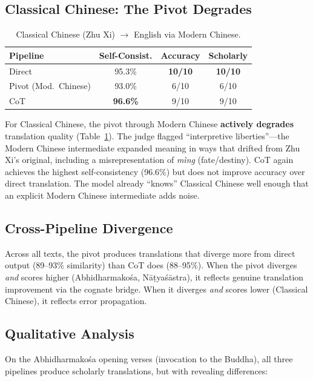 \documentclass[10pt,twocolumn]{article}
\begin{document}
\subsection{Classical Chinese: The Pivot Degrades}

\begin{table}[H]
\small
\centering
\caption{Classical Chinese (Zhu Xi) $\to$ English via Modern Chinese.}
\label{tab:chinese}
\begin{tabular}{@{}lccc@{}}
\toprule
Pipeline & Self-Consist. & Accuracy & Scholarly \\
\midrule
Direct & 95.3\% & \textbf{10/10} & \textbf{10/10} \\
Pivot (Mod.\ Chinese) & 93.0\% & 6/10 & 6/10 \\
CoT & \textbf{96.6\%} & 9/10 & 9/10 \\
\bottomrule
\end{tabular}
\end{table}

For Classical Chinese, the pivot through Modern Chinese \textbf{actively degrades} translation quality (Table~\ref{tab:chinese}). The judge flagged ``interpretive liberties''---the Modern Chinese intermediate expanded meaning in ways that drifted from Zhu Xi's original, including a misrepresentation of \emph{m\`ing} (fate/destiny). CoT again achieves the highest self-consistency (96.6\%) but does not improve accuracy over direct translation. The model already ``knows'' Classical Chinese well enough that an explicit Modern Chinese intermediate adds noise.

\subsection{Cross-Pipeline Divergence}

Across all texts, the pivot produces translations that diverge more from direct output (89--93\% similarity) than CoT does (88--95\%). When the pivot diverges \emph{and} scores higher (Abhidharmako\'sa, N\=a\d{t}ya\'s\=astra), it reflects genuine translation improvement via the cognate bridge. When it diverges \emph{and} scores lower (Classical Chinese), it reflects error propagation.

\subsection{Qualitative Analysis}

On the Abhidharmako\'sa opening verses (invocation to the Buddha), all three pipelines produce scholarly translations, but with revealing differences:
\end{document}
